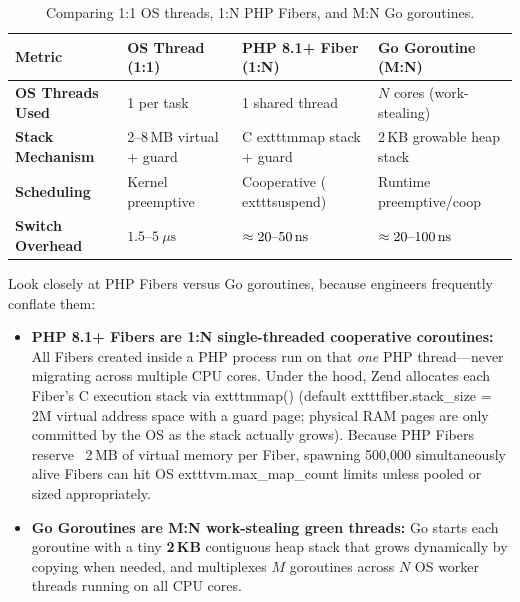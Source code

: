 \begin{table}[htbp]
\centering
\small\sffamily
\begin{tabular}{@{}llll@{}}
\toprule
\textbf{Metric} & \textbf{OS Thread (1:1)} & \textbf{PHP 8.1+ Fiber (1:N)} & \textbf{Go Goroutine (M:N)} \\ \midrule
\textbf{OS Threads Used} & 1 per task & 1 shared thread & $N$ cores (work-stealing) \\
\textbf{Stack Mechanism} & 2--8\,MB virtual + guard & C 	exttt{mmap} stack + guard & 2\,KB growable heap stack \\
\textbf{Scheduling} & Kernel preemptive & Cooperative (	exttt{suspend}) & Runtime preemptive/coop \\
\textbf{Switch Overhead} & $1.5\text{--}5\ \mu\text{s}$ & $\approx 20\text{--}50\text{\,ns}$ & $\approx 20\text{--}100\text{\,ns}$ \\ \bottomrule
\end{tabular}
\caption{Comparing 1:1 OS threads, 1:N PHP Fibers, and M:N Go goroutines.}
\label{tab:v1-ch02-thread-comparison}
\end{table}

Look closely at PHP Fibers versus Go goroutines, because engineers frequently conflate them:
\begin{itemize}[leftmargin=15pt]
  \item \textbf{PHP 8.1+ Fibers are 1:N single-threaded cooperative coroutines:} All Fibers created inside a PHP process run on that \emph{one} PHP thread---never migrating across multiple CPU cores. Under the hood, Zend allocates each Fiber's C execution stack via 	exttt{mmap()} (default 	exttt{fiber.stack\_size = 2M} virtual address space with a guard page; physical RAM pages are only committed by the OS as the stack actually grows). Because PHP Fibers reserve ~2\,MB of virtual memory per Fiber, spawning 500,000 simultaneously alive Fibers can hit OS 	exttt{vm.max\_map\_count} limits unless pooled or sized appropriately.
  \item \textbf{Go Goroutines are M:N work-stealing green threads:} Go starts each goroutine with a tiny \textbf{2\,KB} contiguous heap stack that grows dynamically by copying when needed, and multiplexes $M$ goroutines across $N$ OS worker threads running on all CPU cores.
\end{itemize}

